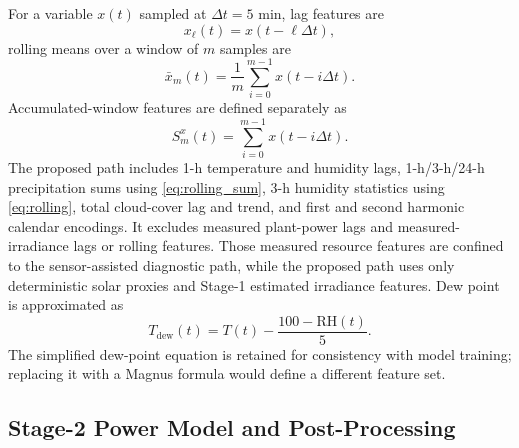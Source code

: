 For a variable $x(t)$ sampled at $\Delta t=5$ min, lag features are
\begin{equation}
x_{\ell}(t)=x(t-\ell\Delta t),
\label{eq:lag}
\end{equation}
rolling means over a window of $m$ samples are
\begin{equation}
\bar{x}_{m}(t)=\frac{1}{m}\sum_{i=0}^{m-1}x(t-i\Delta t).
\label{eq:rolling}
\end{equation}
Accumulated-window features are defined separately as
\begin{equation}
S^{x}_{m}(t)=\sum_{i=0}^{m-1}x(t-i\Delta t).
\label{eq:rolling_sum}
\end{equation}
The proposed path includes 1-h temperature and humidity lags, 1-h/3-h/24-h precipitation sums using \eqref{eq:rolling_sum}, 3-h humidity statistics using \eqref{eq:rolling}, total cloud-cover lag and trend, and first and second harmonic calendar encodings. It excludes measured plant-power lags and measured-irradiance lags or rolling features. Those measured resource features are confined to the sensor-assisted diagnostic path, while the proposed path uses only deterministic solar proxies and Stage-1 estimated irradiance features. Dew point is approximated as
\begin{equation}
T_{\mathrm{dew}}(t)=T(t)-\frac{100-\mathrm{RH}(t)}{5}.
\label{eq:dewpoint}
\end{equation}
The simplified dew-point equation is retained for consistency with model training; replacing it with a Magnus formula would define a different feature set.

\subsection{Stage-2 Power Model and Post-Processing}

